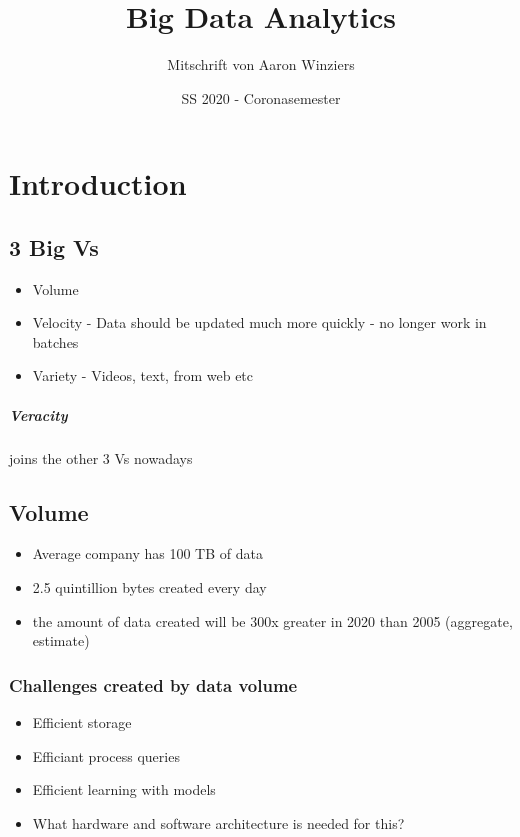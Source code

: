 \documentclass[10pt,a4paper]{scrreprt}
\author{Mitschrift von Aaron Winziers}
\title{Big Data Analytics}
\date{SS 2020 - Coronasemester}
\begin{document}
	\maketitle

	
\chapter{Introduction}
\section{3 Big Vs}
\begin{itemize}
	\item Volume
	\item Velocity - Data should be updated much more quickly - no longer work in batches
	\item Variety - Videos, text, from web etc
\end{itemize}


\paragraph{Veracity} joins the other 3 Vs nowadays

\section{Volume}
\begin{itemize}
	\item Average company has 100 TB of data
	\item 2.5 quintillion bytes created every day
	\item the amount of data created will be 300x greater in 2020 than 2005 (aggregate, estimate)
\end{itemize}

\subsection{Challenges created by data volume}
\begin{itemize}
	\item Efficient storage
	\item Efficiant process queries
	\item Efficient learning with models
	\item What hardware and software architecture is needed for this?
\end{itemize}
\end{document}
